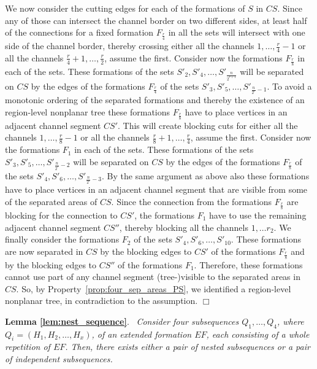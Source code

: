 \documentclass[a4paper,10pt]{llncs}
\newcounter{prop}
\renewenvironment{proof}
{{\bf Proof:}}{\hspace*{\fill}$\Box$\par\vspace{2mm}}
\newcommand{\rephrase}[3]{\noindent\textbf{#1 #2}.~\emph{#3}}
\begin{document}
\begin{proof}
We now consider the cutting edges for each of the formations of $S$ in $CS$. Since any of those can intersect the channel border on two different sides, at least half of the connections for a fixed formation $F_{\frac{r}{4}}$ in all the sets will intersect with one side of the channel border, thereby crossing either all the channels $1, \ldots , \frac{r}{4}-1$ or all the channels ${\frac{r}{4}}+1, \ldots , \frac{r}{2}$, assume the first. Consider now the formations $F_{\frac{r}{8}}$ in each of the sets.
These formations of the sets $S'_2, S'_4, \ldots, S'_{\frac{n}{2^{r+1}}}$ will be separated on $CS$ by the edges of the formations $F_{\frac{r}{4}}$ of the sets $S'_3, S'_5, \ldots, S'_{\frac{n}{2^r}-1}$. To avoid a monotonic ordering of the separated formations and thereby the existence of an region-level nonplanar tree these formations $F_{\frac{r}{8}}$ have to place vertices in an adjacent channel segment $CS'$. This will create blocking cuts for either all the channels $1, \ldots , \frac{r}{8}-1$ or all the channels ${\frac{r}{8}}+1, \ldots , \frac{r}{4}$, assume the first.
Consider now the formations $F_1$ in each of the sets. These formations of the sets $S'_3, S'_5, \ldots, S'_{\frac{n}{2^r}-2}$ will be separated on $CS$ by the edges of the formations $F_{\frac{r}{8}}$ of the sets $S'_4, S'_6, \ldots, S'_{\frac{n}{2^r}-3}$.
By the same argument as above also these formations have to place vertices in an adjacent channel segment that are visible from some of the separated areas of $CS$. Since the connection from the formations $F_{\frac{r}{8}}$ are blocking for the connection to $CS'$, the formations $F_1$ have to use the remaining adjacent channel segment $CS''$, thereby blocking all the channels $1, \ldots r_2$. We finally consider the formations $F_2$  of the sets $S'_4, S'_6, \ldots, S'_{10}$. These formations are now separated in $CS$ by the blocking edges to $CS'$ of the formations $F_{\frac{r}{8}}$ and by the blocking edges to $CS''$ of the formations $F_1$. Therefore, these formations cannot use part of any channel segment (tree-)visible to the separated areas in $CS$. So, by Property~\ref{prop:four_sep_areas_PS}, we identified a region-level nonplanar tree, in contradiction to the assumption.
\end{proof}

\rephrase{Lemma}{\ref{lem:nest_sequence}}{
Consider four subsequences $Q_1,\ldots ,Q_4$, where $Q_i = (H_1,H_2,\ldots,H_x)$, of an extended formation $EF$, each consisting of a whole repetition of $EF$. Then, there exists either a pair of nested subsequences or a pair of independent subsequences.
}
\end{document}
